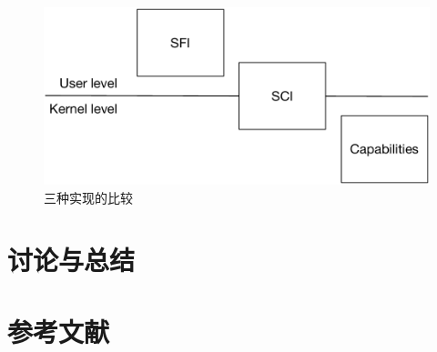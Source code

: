 \documentclass[final,12pt]{elsarticle}
\begin{document}
\begin{figure}
\centering
\includegraphics[width=0.7\linewidth]{imgs/difference}
\caption{三种实现的比较}
\label{fig:difference}
\end{figure}

\section{讨论与总结}
\label{s:tucao}


\clearpage

\section*{参考文献}





 

\end{document}
